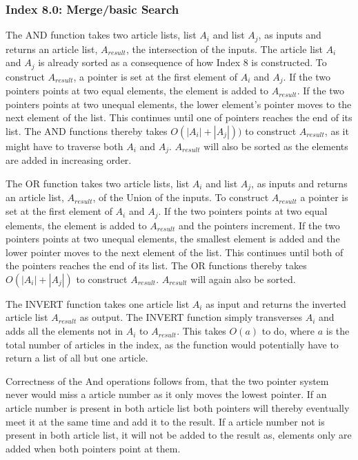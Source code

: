 \subsubsection{Index 8.0: Merge/basic Search}
The AND function takes two article lists, list $A_i$ and list $A_j$, as inputs and returns an article list, $A_{result}$, the intersection of the inputs. The article list $A_i$ and $A_j$ is already sorted as a consequence of how Index 8 is constructed. To construct $A_{result}$, a pointer is set at the first element of $A_i$ and $A_j$. If the two pointers points at two equal elements, the element is added to $A_{result}$. If the two pointers points at two unequal elements, the lower element's pointer moves to the next element of the list. This continues until one of pointers reaches the end of its list. The AND functions thereby takes $O(|A_i| + |A_j|))$ to construct $A_{result}$, as it might have to traverse both $A_i$ and $A_j$. $A_{result}$ will also be sorted as the elements are added in increasing order.

The OR function takes two article lists, list $A_i$ and list $A_j$, as inputs and returns an article list, $A_{result}$, of the Union of the inputs. To construct $A_{result}$ a pointer is set at the first element of $A_i$ and $A_j$. If the two pointers points at two equal elements, the element is added to $A_{result}$ and the pointers increment. If the two pointers points at two unequal elements, the smallest element is added and the lower pointer moves to the next element of the list. This continues until both of the pointers reaches the end of its list. The OR functions thereby takes $O(|A_i| + |A_j|)$ to construct $A_{result}$. $A_{result}$ will again also be sorted.

The INVERT function takes one article list $A_i$ as input and returns the inverted article list $A_{result}$ as output. The INVERT function simply transverses $A_i$ and adds all the elements not in $A_i$ to $A_{result}$.
This takes $O(a)$ to do, where $a$ is the total number of articles in the index, as the function would potentially have to return a list of all but one article. 

Correctness of the And operations follows from, that the two pointer system never would miss a article number as it only moves the lowest pointer. If an article number is present in both article list both pointers will thereby eventually meet it at the same time and add it to the result. If a article number not is present in both article list, it will not be added to the result as, elements only are added when both pointers point at them.

